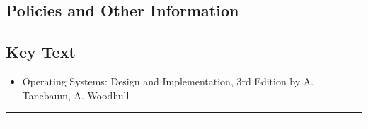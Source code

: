 
 \subsection*{Policies and Other Information}
 \subsection*{Key Text}

 \begin{itemize}
   \item Operating Systems: Design and Implementation, 3rd Edition by A. Tanebaum, A. Woodhull
 \end{itemize}
\vspace{2ex}\hrule
\vspace{2ex}\hrule\vspace{2ex}
